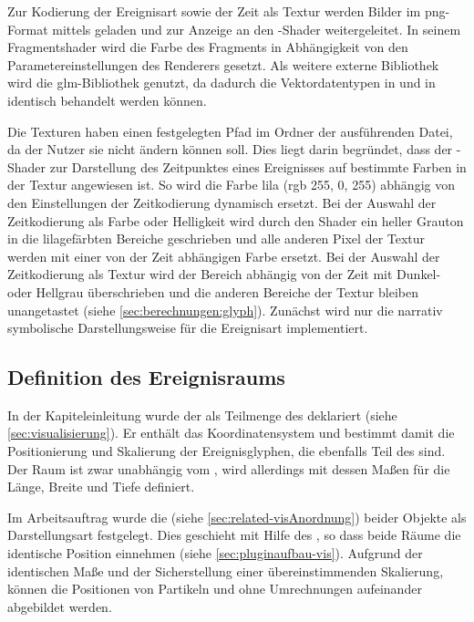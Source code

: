 Zur Kodierung der Ereignisart sowie der Zeit als Textur werden Bilder im \gls{png}-Format mittels  geladen und zur Anzeige an den -Shader weitergeleitet. In seinem Fragmentshader wird die Farbe des Fragments in Abhängigkeit von den Parametereinstellungen des Renderers gesetzt.
Als weitere externe Bibliothek wird die \gls{glm}-Bibliothek genutzt, da dadurch die Vektordatentypen in  und in  identisch behandelt werden können.

Die Texturen haben einen festgelegten Pfad im Ordner der ausführenden Datei, da der Nutzer sie nicht ändern können soll. Dies liegt darin begründet, dass der -Shader zur Darstellung des Zeitpunktes eines Ereignisses auf bestimmte Farben in der Textur angewiesen ist. So wird die Farbe lila (rgb 255, 0, 255) abhängig von den Einstellungen der Zeitkodierung dynamisch ersetzt. Bei der Auswahl der Zeitkodierung als Farbe oder Helligkeit wird durch den Shader ein heller Grauton in die lilagefärbten Bereiche geschrieben und alle anderen Pixel der Textur werden mit einer von der Zeit abhängigen Farbe ersetzt. Bei der Auswahl der Zeitkodierung als Textur wird der Bereich abhängig von der Zeit mit Dunkel- oder Hellgrau überschrieben und die anderen Bereiche der Textur bleiben unangetastet (siehe \autoref{sec:berechnungen:glyph}). Zunächst wird nur die narrativ symbolische Darstellungsweise für die Ereignisart implementiert.


\subsection*{Definition des Ereignisraums}\label{sec:vis:ereignisraum}
In der Kapiteleinleitung wurde der  als Teilmenge des  deklariert (siehe \autoref{sec:visualisierung}). Er enthält das Koordinatensystem und bestimmt damit die Positionierung und Skalierung der Ereignisglyphen, die ebenfalls Teil des  sind. Der Raum ist zwar unabhängig vom , wird allerdings mit dessen Maßen für die Länge, Breite und Tiefe definiert.

Im Arbeitsauftrag wurde die  (siehe \autoref{sec:related-visAnordnung}) beider Objekte als Darstellungsart festgelegt. Dies geschieht mit Hilfe des , so dass beide Räume die identische Position einnehmen (siehe \autoref{sec:pluginaufbau-vis}). Aufgrund der identischen Maße und der Sicherstellung einer übereinstimmenden Skalierung, können die Positionen von Partikeln und  ohne Umrechnungen aufeinander abgebildet werden.

